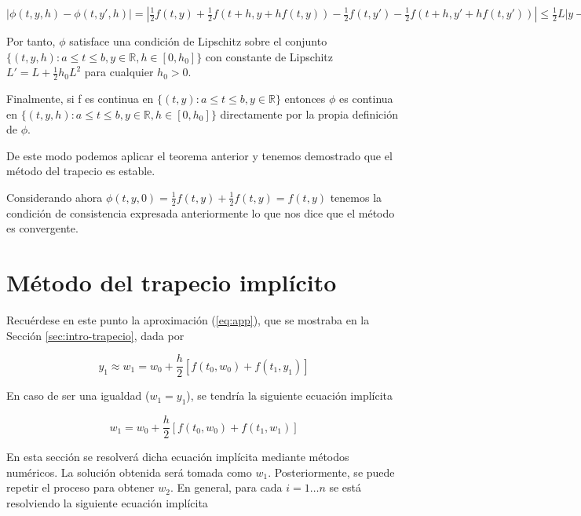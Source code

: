 \documentclass{article}
\theoremstyle{theorem-style}  %
\theoremstyle{definition-style}
\theoremstyle{example-style}
\begin{document}
	$|\phi(t,y,h)-\phi(t,y',h)|=|\frac{1}{2}f(t,y)+\frac{1}{2}f(t+h,y+hf(t,y))-\frac{1}{2}f(t,y')-\frac{1}{2}f(t+h,y'+hf(t,y'))| \leq \frac{1}{2}L|y-y'|+\frac{1}{2}L|y+hf(t,y)-y'-hf(t,y')| \leq L |y-y'|+\frac{1}{2}L|hf(t,y)-hf(t,y')|=(L+\frac{1}{2}hL^{2})|y-y'|$ 
	
	Por tanto, $\phi$ satisface una condición de Lipschitz sobre el conjunto 
	$\{(t,y,h):a \leq t \leq b, y \in \mathbb{R}, h \in [0,h_0]\}$ 
	con constante de Lipschitz 
	$L'=L+\frac{1}{2} h_0 L^{2}$ 
	para cualquier $h_0 > 0$. 
	
	Finalmente, si f es continua en 
	$\{(t,y):a \leq t \leq b, y \in \mathbb{R}\}$ 
	entonces $\phi$ es continua en 
	$\{(t,y,h):a \leq t \leq b, y \in \mathbb{R}, h \in [0,h_0]\}$ 
	directamente por la propia definición de $\phi$. 
	
	De este modo podemos aplicar el teorema anterior y tenemos demostrado que el método del trapecio es estable. 
	
	Considerando ahora $\phi(t,y,0)=\frac{1}{2}f(t,y)+\frac{1}{2}f(t,y)=f(t,y)$ tenemos la condición de consistencia expresada anteriormente lo que nos dice que el método es convergente.


\section{Método del trapecio implícito} \label{sec:trapecio-iterativo}
	
	
	Recuérdese en este punto la aproximación (\ref{eq:app}), que se mostraba en la Sección \ref{sec:intro-trapecio}, dada por

	\begin{equation*}
		y_1 \approx w_1 = w_0 + \frac{h}{2} \left[f(t_0,w_0) + f(t_1, y_1)\right]
	\end{equation*}

	En caso de ser una igualdad ($w_1 = y_1$), se tendría la siguiente ecuación implícita

	\begin{equation*}
		w_1 = w_0 + \frac{h}{2} \left[f(t_0,w_0) + f(t_1, w_1)\right]
	\end{equation*}

	En esta sección se resolverá dicha ecuación implícita mediante métodos numéricos. La solución obtenida será tomada como $w_1$. Posteriormente, se puede repetir el proceso para obtener $w_2$. En general, para cada $i = 1 \ldots n$ se está resolviendo la siguiente ecuación implícita
\end{document}
